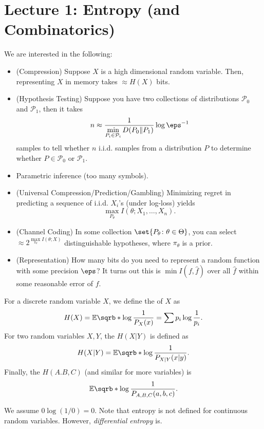 \section*{Lecture 1: Entropy (and Combinatorics)}
\setcounter{section}{1}

\begin{fact}
	We are interested in the following:
	\begin{itemize}
		\item (Compression) Suppose $X$ is a high dimensional random variable. Then, representing $X$ in memory takes $\approx H(X)$ bits.
		\item (Hypothesis Testing) Suppose you have two collections of distributions $\mathcal P_0$ and $\mathcal P_1$, then it takes \[
				n \approx \frac{1}{\min\limits_{P_i\in\mathcal P_i} D(P_0\Vert P_1)} \log \eps^{-1}
			\]
			samples to tell whether $n$ i.i.d. samples from a distribution $P$ to determine whether $P\in\mathcal P_0$ or $\mathcal P_1$.
		\item Parametric inference (too many symbols).
		\item (Universal Compression/Prediction/Gambling) Minimizing regret in predicting a sequence of i.i.d. $X_i$'s (under log-loss) yields \[
				\max_{P_\theta} I(\theta; X_1, \ldots, X_n).
			\]
		\item (Channel Coding) In some collection $\set{P_\theta\colon \theta\in \Theta}$, you can select $\approx 2^{\max\limits_{\pi_\theta} I(\theta;X)}$ distinguishable hypotheses, where $\pi_\theta$ is a prior.
		\item (Representation) How many bits do you need to represent a random function with some precision $\eps$? It turns out this is $\min I(f, \hat f)$ over all $\hat f$ within some reasonable error of $f$.
	\end{itemize}
\end{fact}

\begin{defn}
	[Entropy]
	For a discrete random variable $X$, we define the  of $X$ as \[
		H(X) = \mathbb E\sqrb*{\log \frac{1}{P_X(x)}} = \sum p_i \log \frac{1}{p_i}.
	\]
	For two random variables $X,Y$, the  $H(X|Y)$ is defined as \[
		H(X|Y) = \mathbb E\sqrb*{\log \frac{1}{P_{X|Y}(x|y)}}.
	\]
	Finally, the  $H(A.B,C)$ (and similar for more variables) is \[
		\mathbb E\sqrb*{\log \frac{1}{P_{A,B,C}(a,b,c)}}.
	\]
\end{defn}

We assume $0\log (1/0) = 0$.
Note that entropy is not defined for continuous random variables. However, \emph{differential entropy} is.

